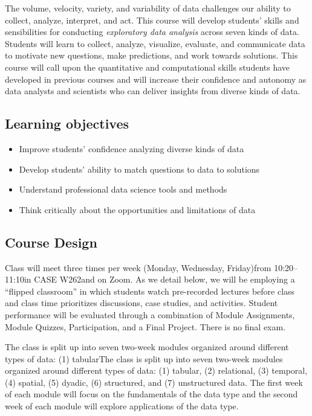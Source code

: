 \documentclass[10pt]{memoir}
\def\myclassroom{CASE W262}
\def\mymeetingdays{Monday, Wednesday, Friday}
\def\mymeetingtimes{10:20--11:10}
\begin{document}
The volume, velocity, variety, and variability of data challenges our ability to collect, analyze, interpret, and act. This course will develop students' skills and sensibilities for conducting \textit{exploratory data analysis} across seven kinds of data. Students will learn to collect, analyze, visualize, evaluate, and communicate data to motivate new questions, make predictions, and work towards solutions. This course will call upon the quantitative and computational skills students have developed in previous courses and will increase their confidence and autonomy as data analysts and scientists who can deliver insights from diverse kinds of data.

\subsection{Learning objectives}

\begin{itemize}
    \item Improve students' confidence analyzing diverse kinds of data
    \item Develop students' ability to match questions to data to solutions
    \item Understand professional data science tools and methods
    \item Think critically about the opportunities and limitations of data
\end{itemize}

\subsection{Course Design}
Class will meet three times per week (\mymeetingdays)\space from \mymeetingtimes\space in \myclassroom\space and on Zoom. As we detail below, we will be employing a ``flipped classroom'' in which students watch pre-recorded lectures before class and class time prioritizes discussions, case studies, and activities. Student performance will be evaluated through a combination of Module Assignments, Module Quizzes, Participation, and a Final Project. There is no final exam.

The class is split up into seven two-week modules organized around different types of data: (1) tabularThe class is split up into seven two-week modules organized around different types of data: (1) tabular, (2) relational, (3) temporal, (4) spatial, (5) dyadic, (6) structured, and (7) unstructured data. The first week of each module will focus on the fundamentals of the data type and the second week of each module will explore applications of the data type.
\end{document}

